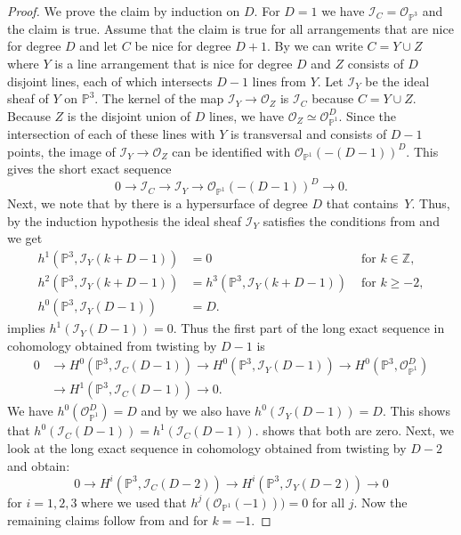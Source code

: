 \documentclass[a4paper,10pt]{amsart}
\theoremstyle{definition}
\theoremstyle{plain}
\newcommand{\cI}{{\mathcal I}}
\newcommand{\cO}{{\mathcal O}}
\newcommand{\pp}{\mathbb{P}}
\newcommand{\Z}{{\mathbb Z}}
\begin{document}
\begin{proof}
    We prove the claim by induction on $D$. For $D=1$ we have $\cI_C=\cO_{\pp^3}$ and the claim is true. Assume that the claim is true for all arrangements that are nice for degree $D$ and let $C$ be nice for degree $D+1$. By  we can write $C=Y\cup Z$ where $Y$ is a line arrangement that is nice for degree $D$ and $Z$ consists of $D$ disjoint lines, each of which intersects $D-1$ lines from $Y$. Let $\cI_Y$ be the ideal sheaf of $Y$ on $\pp^3$. The kernel of the map $\cI_Y\to\cO_Z$ is $\cI_C$ because $C=Y\cup Z$. Because $Z$ is the disjoint union of $D$ lines, we have $\cO_Z\simeq\cO_{\pp^1}^D$. Since the intersection of each of these lines with $Y$ is transversal and consists of $D-1$ points, the image of $\cI_Y\to\cO_Z$ can be identified with $\cO_{\pp^1}(-(D-1))^D$.    
    This gives the short exact sequence
    \begin{equation}\label{eq:sequencenicearrangement}
        0\to\cI_C\to\cI_Y\to\cO_{\pp^1}(-(D-1))^D\to0.
    \end{equation}
    Next, we note that by  there is a hypersurface of degree $D$ that contains~$Y$. Thus, by  the induction hypothesis the ideal sheaf $\cI_Y$ satisfies the conditions from  and we get
    \begin{align}
        h^1(\pp^3,\cI_Y(k+D-1))&=0&\textrm{ for }k\in\Z,\label{eq:coho1} \\
        h^2(\pp^3,\cI_Y(k+D-1))&=h^3(\pp^3,\cI_Y(k+D-1))&\textrm{ for }k\geq-2,\label{eq:coho2}\\
        h^0(\pp^3,\cI_Y(D-1))&=D.\label{eq:cohoD}
    \end{align}
     implies $h^1(\cI_Y(D-1))=0$. Thus the first part of the long exact sequence in cohomology obtained from twisting  by $D-1$ is
    \begin{align*}
        0&\to H^0(\pp^3,\cI_C(D-1))\to H^0(\pp^3,\cI_Y(D-1))\to H^0(\pp^3,\cO_{\pp^1}^D)\\&\to H^1(\pp^3,\cI_C(D-1))\to0.
    \end{align*}
    We have $h^0(\cO_{\pp^1}^D)=D$ and by  we also have $h^0(\cI_Y(D-1))=D$. This shows that $h^0(\cI_C(D-1))=h^1(\cI_C(D-1))$.  shows that both are zero. Next, we look at the long exact sequence in cohomology obtained from twisting  by $D-2$ and obtain:
    \begin{equation*}
        0\to H^i(\pp^3,\cI_C(D-2))\to H^i(\pp^3,\cI_Y(D-2))\to 0
    \end{equation*}
    for $i=1,2,3$ where we used that $h^j(\cO_{\pp^1}(-1)))=0$ for all $j$. Now the remaining claims follow from  and  for $k=-1$.
\end{proof}
\end{document}

